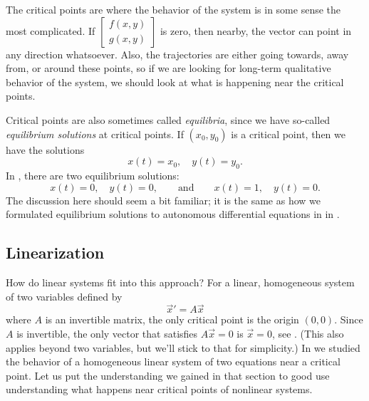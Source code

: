 The critical points are where the behavior of the system is
in some sense the most complicated.  If
$\left[ \begin{smallmatrix} f(x,y) \\ g(x,y) \end{smallmatrix} \right]$
is zero, then nearby, the vector can point in any direction whatsoever.
Also, the trajectories are either going towards, away from, or around these
points, so if we are looking for long-term qualitative behavior of the system, we
should look at what is happening near the critical points.

Critical points are also sometimes called
\emph{equilibria}, since we have so-called
\emph{equilibrium solutions} at critical points.
If $(x_0,y_0)$ is a critical point, then we have the solutions
\begin{equation*}
x(t) = x_0, \quad y(t) = y_0 .
\end{equation*}
In , there are two equilibrium
solutions:
\begin{equation*}
x(t) = 0, \quad y(t) = 0,
\qquad \text{and} \qquad
x(t) = 1, \quad y(t) = 0.
\end{equation*}
The discussion here should seem a bit familiar; it is the same as how we formulated equilibrium solutions to
autonomous differential equations in in
.  

\subsection{Linearization}

How do linear systems fit into this approach? For a linear, homogeneous system of two variables defined by
\begin{equation*}
\vec{x}' = A\vec{x}
\end{equation*}
where $A$ is an invertible matrix, the only critical point is
the origin $(0,0)$. Since $A$ is invertible, the only vector that satisfies $A\vec{x} = 0$ is $\vec{x} = 0$, see . (This also applies beyond two variables, but we'll stick to that for simplicity.) In  we studied the behavior of a homogeneous
linear system of two equations near a critical point. 
Let us put the understanding we gained in that section to good use
understanding what happens near critical points of nonlinear systems.

